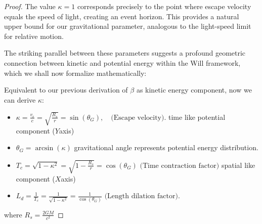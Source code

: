 \documentclass{article}
\begin{document}
\begin{theorem}
\begin{proof}
The value $\kappa = 1$ corresponds precisely to the point where escape velocity equals the speed of light, creating an event horizon. This provides a natural upper bound for our gravitational parameter, analogous to the light-speed limit for relative motion.

The striking parallel between these parameters suggests a profound geometric connection between kinetic and potential energy within the Will framework, which we shall now formalize mathematically:

Equivalent to our previous derivation of $\beta$ as kinetic energy component, now we can derive $\kappa$:
\begin{itemize}
    \item  \textbf{$ \kappa =  \frac{v_e}{c} = \sqrt{\frac{R_s}{r}} =  \sin\left(\theta_G\right), \quad \text{(Escape velocity)}$}. time like potential component ($Y$axis) 
\end{itemize}
\begin{itemize}
    \item \textbf{$\theta_G = \arcsin(\kappa)$} gravitational angle represents potential energy distribution.
\end{itemize}
    \begin{itemize}
        \item   $T_c =\sqrt{1-\kappa^2}=\sqrt{1-\frac{R_s}{r}}  =\cos(\theta_G)\text{ (Time contraction factor)}$ spatial like component  ($X$axis) 
        \item $L_d =\frac{1}{T_c}=\frac{1}{\sqrt{1-\kappa^2} }=\frac{1}{\cos(\theta_G)}\text{ (Length dilation factor)}$.
    \end{itemize}
where $R_s = \frac{2GM}{c^2}$

\end{proof}
\end{theorem}
\end{document}
